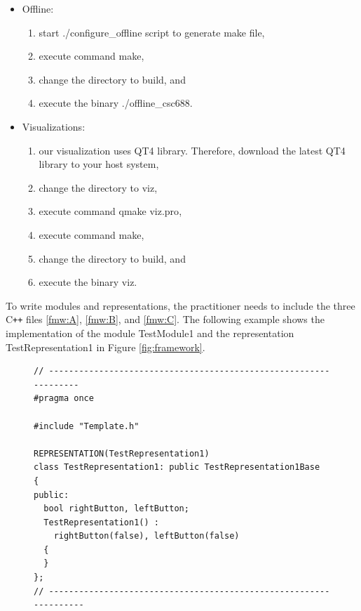 \documentclass{llncs}
\begin{document}
\begin{sloppy}
\begin{itemize}
\item Offline:
\begin{enumerate}
\item start {\sf ./configure\_offline} script to generate make file,
\item execute command {\sf make},
\item change the directory to {\sf build}, and 
\item execute the binary {./offline\_csc688}.
\end{enumerate}

\item Visualizations:
\begin{enumerate}
\item our visualization uses QT4 library. Therefore, download the latest QT4 library to your host
system,
\item change the directory to {\sf viz},
\item execute command {\sf qmake viz.pro},
\item execute command {\sf make},
\item change the directory to {\sf build}, and 
\item execute the binary {\sf viz}.
\end{enumerate}

\end{itemize}


To write modules and representations, the practitioner needs to include the three C\texttt{++}
files \ref{fmw:A}, \ref{fmw:B}, and \ref{fmw:C}. The following example shows the implementation
of the module {\sf TestModule1} and the representation {\sf TestRepresentation1} in Figure
\ref{fig:framework}.

\begin{figure}[!ht]
\begin{center}
\begin{verbatim}
// -----------------------------------------------------------------
#pragma once

#include "Template.h"

REPRESENTATION(TestRepresentation1)
class TestRepresentation1: public TestRepresentation1Base
{
public:
  bool rightButton, leftButton;
  TestRepresentation1() :
    rightButton(false), leftButton(false)
  {
  }
};
// ------------------------------------------------------------------
\end{verbatim}
\end{center}
\label{list:TestRepresentation1.h}
\end{figure}


\end{sloppy}
\end{document}
